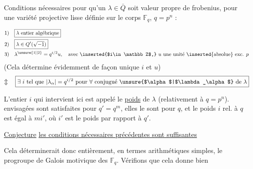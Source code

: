 Conditions nécessaires pour qu'un $\lambda\in\bar Q$ soit valeur
propre de  frobenius, pour une variété projective
lisse définie sur le corps $\mathbb F_q$, $q=p^n$ :


\[
\begin{aligned}
1)&\quad\boxed{\lambda\ \text{entier algébrique}}\\
2)&\quad\boxed{\lambda\in Q'(\sqrt{-1})}\\
3)&\quad\lambda^{\unsure{1|{}|2}}=q^{i/2}u,\quad\text{avec \inserted{$i\in\mathbb Z$,} $u$ une unité \inserted{absolue} exc. $p$}
\end{aligned}
\]
(Cela détermine évidemment de façon unique $i$ et $u$)
\[
\Updownarrow\quad \boxed{\exists\ i\ \text{tel que }|\lambda_\alpha|=q^{i/2}\text{ pour }\forall\text{ conjugué \unsure{$\alpha$|$\lambda_\alpha$} de }\lambda}
\]

L'entier $i$ qui intervient ici est appelé le \uline{poids} de $\lambda$
(relativement à $q=p^n$). 
  envisagées sont satisfaites  pour
$q'=q^m$, elles le sont pour $q$, et le poids $i$
rel. à $q$ est égal à $mi'$, où $i'$ est le poids par
rapport à $q'$.

\uline{Conjecture}  \uline{} \uline{les conditions nécessaires
précédentes sont suffisantes}

Cela déterminerait donc entièrement, en termes
arithmétiques simples, le progroupe de Galois  motivique
des $\mathbb F_q$. Vérifions que cela donne bien

